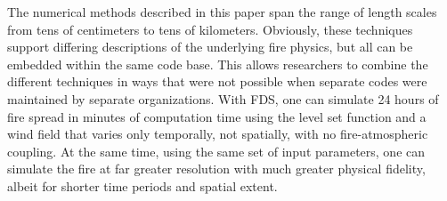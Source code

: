 \documentclass[journal,article,atmosphere,submit,moreauthors,pdftex]{Definitions_Review_Process/mdpi}
\begin{document}
The numerical methods described in this paper span the range of length scales from tens of centimeters to tens of kilometers. Obviously, these techniques support differing descriptions of the underlying fire physics, but all can be embedded within the same code base. This allows researchers to combine the different techniques in ways that were not possible when separate codes were maintained by separate organizations. With FDS, one can simulate 24 hours of fire spread in minutes of computation time using the level set function and a wind field that varies only temporally, not spatially, with no fire-atmospheric coupling. At the same time, using the same set of input parameters, one can simulate the fire at far greater resolution with much greater physical fidelity, albeit for shorter time periods and spatial extent.















\end{document}
